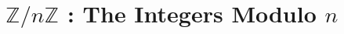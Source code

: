 \documentclass[9pt]{book}
\newcommand{\Z}{\mathbb{Z}}
\begin{document}
      \section{$\Z/n\Z$ : The Integers Modulo $n$}
         
\begin{comment}
   \chapter{Preliminaries}
      \section{Basics}
         
      \section{Properties Of The Integers}
         
      \section{$\Z/n\Z$ : The Integers Modulo $n$}
         
         
   \part{}

   \chapter{Introduction To Groups}
      \section{Basic Axioms And Examples}
         
      \section{Dihedral Groups}
         
      \section{Symmetric Groups}
         
      \section{Matrix Groups}
         
      \section{The Quaternion Group}
         

\end{comment}
\end{document}
